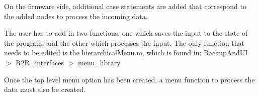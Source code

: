 On the firmware side, additional case statements are added that correspond to the added nodes to process the incoming data.

The user has to add in two functions, one which saves the input to the state of the program, and the other which processes the input. The only function that needs to be edited is the {\ttfamily hierarchical\+Menu.\+m}, which is found in\+: {\ttfamily Backup\+And\+UI $>$ R2\+R\+\_\+interfaces $>$ menu\+\_\+library}

 Once the top level menu option has been created, a menu function to process the data must also be created.

